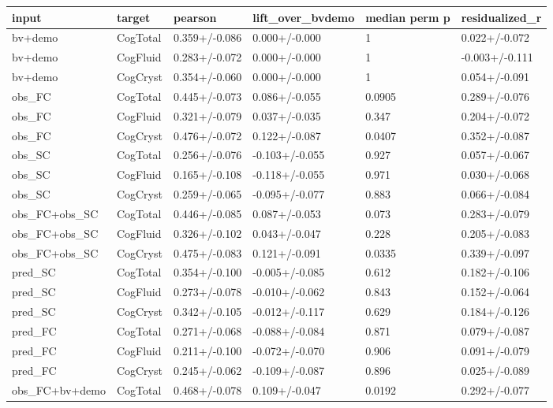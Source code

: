 {\def\LTcaptype{none} %
\begin{longtable}[]{@{}llllll@{}}
\toprule\noalign{}
input & target & pearson & lift\_over\_bvdemo & median perm p & residualized\_r \\
\midrule\noalign{}
\endhead
\bottomrule\noalign{}
\endlastfoot
bv+demo & CogTotal & 0.359+/-0.086 & 0.000+/-0.000 & 1 & 0.022+/-0.072 \\
bv+demo & CogFluid & 0.283+/-0.072 & 0.000+/-0.000 & 1 & -0.003+/-0.111 \\
bv+demo & CogCryst & 0.354+/-0.060 & 0.000+/-0.000 & 1 & 0.054+/-0.091 \\
obs\_FC & CogTotal & 0.445+/-0.073 & 0.086+/-0.055 & 0.0905 & 0.289+/-0.076 \\
obs\_FC & CogFluid & 0.321+/-0.079 & 0.037+/-0.035 & 0.347 & 0.204+/-0.072 \\
obs\_FC & CogCryst & 0.476+/-0.072 & 0.122+/-0.087 & 0.0407 & 0.352+/-0.087 \\
obs\_SC & CogTotal & 0.256+/-0.076 & -0.103+/-0.055 & 0.927 & 0.057+/-0.067 \\
obs\_SC & CogFluid & 0.165+/-0.108 & -0.118+/-0.055 & 0.971 & 0.030+/-0.068 \\
obs\_SC & CogCryst & 0.259+/-0.065 & -0.095+/-0.077 & 0.883 & 0.066+/-0.084 \\
obs\_FC+obs\_SC & CogTotal & 0.446+/-0.085 & 0.087+/-0.053 & 0.073 & 0.283+/-0.079 \\
obs\_FC+obs\_SC & CogFluid & 0.326+/-0.102 & 0.043+/-0.047 & 0.228 & 0.205+/-0.083 \\
obs\_FC+obs\_SC & CogCryst & 0.475+/-0.083 & 0.121+/-0.091 & 0.0335 & 0.339+/-0.097 \\
pred\_SC & CogTotal & 0.354+/-0.100 & -0.005+/-0.085 & 0.612 & 0.182+/-0.106 \\
pred\_SC & CogFluid & 0.273+/-0.078 & -0.010+/-0.062 & 0.843 & 0.152+/-0.064 \\
pred\_SC & CogCryst & 0.342+/-0.105 & -0.012+/-0.117 & 0.629 & 0.184+/-0.126 \\
pred\_FC & CogTotal & 0.271+/-0.068 & -0.088+/-0.084 & 0.871 & 0.079+/-0.087 \\
pred\_FC & CogFluid & 0.211+/-0.100 & -0.072+/-0.070 & 0.906 & 0.091+/-0.079 \\
pred\_FC & CogCryst & 0.245+/-0.062 & -0.109+/-0.087 & 0.896 & 0.025+/-0.089 \\
obs\_FC+bv+demo & CogTotal & 0.468+/-0.078 & 0.109+/-0.047 & 0.0192 & 0.292+/-0.077 \\

\end{longtable}}
